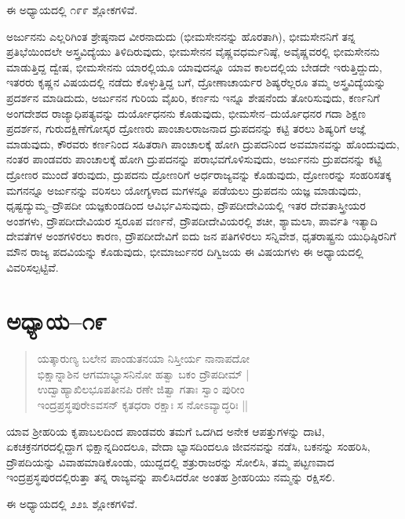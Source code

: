 ಈ ಅಧ್ಯಾಯದಲ್ಲಿ ೧೯೯ ಶ್ಲೋಕಗಳಿವೆ.

ಅರ್ಜುನನು ಎಲ್ಲರಿಗಿಂತ ಶ್ರೇಷ್ಠನಾದ ವೀರನಾದುದು (ಭೀಮಸೇನನನ್ನು ಹೊರತಾಗಿ), ಭೀಮಸೇನನಿಗೆ ತನ್ನ ಪ್ರತಿಭೆಯಿಂದಲೇ ಅಸ್ತ್ರವಿದ್ಯೆಯು ತಿಳಿದಿರುವುದು, ಭೀಮಸೇನನ ವೈಷ್ಣವಧರ್ಮನಿಷ್ಠೆ, ಅವೈಷ್ಣವರಲ್ಲಿ ಭೀಮಸೇನನು ಮಾಡುತ್ತಿದ್ದ ದ್ವೇಷ, ಭೀಮಸೇನನು ಯಾರಲ್ಲಿಯೂ ಯಾವುದನ್ನೂ ಯಾವ ಕಾಲದಲ್ಲಿಯ ಬೇಡದೇ ಇರುತ್ತಿದ್ದುದು, ಇತರರು ಕೃಷ್ಣನ ವಿಷಯದಲ್ಲಿ ನಡೆದು ಕೊಳ್ಳುತ್ತಿದ್ದ ಬಗೆ, ದ್ರೋಣಾಚಾರ್ಯರ ಶಿಷ್ಯರೆಲ್ಲರೂ ತಮ್ಮ ಅಸ್ತ್ರವಿದ್ಯೆಯನ್ನು ಪ್ರದರ್ಶನ ಮಾಡಿದುದು, ಅರ್ಜುನನ ಗುರಿಯ ವೈಖರಿ, ಕರ್ಣನು ಇನ್ನೂ ಶೇಷನೆಂದು ತೋರಿಸುವುದು, ಕರ್ಣನಿಗೆ ಅಂಗದೇಶದ ರಾಜ್ಯಾಧಿಪತ್ಯವನ್ನು ದುರ್ಯೋಧನನು ಕೊಡುವುದು, ಭೀಮಸೇನ–ದುರ್ಯೊಧನರ ಗದಾ ಶಿಕ್ಷಣ ಪ್ರದರ್ಶನ, ಗುರುದಕ್ಷಿಣೆಗೋಸ್ಕರ ದ್ರೋಣರು ಪಾಂಚಾಲರಾಜನಾದ ದ್ರುಪದನನ್ನು ಕಟ್ಟಿ ತರಲು ಶಿಷ್ಯರಿಗೆ ಆಜ್ಞೆ ಮಾಡುವುದು, ಕೌರವರು ಕರ್ಣನಿಂದ ಸಹಿತರಾಗಿ ಪಾಂಚಾಲಕ್ಕೆ ಹೋಗಿ ದ್ರುಪದನಿಂದ ಅವಮಾನವನ್ನು ಹೊಂದುವುದು, ನಂತರ ಪಾಂಡವರು ಪಾಂಚಾಲಕ್ಕೆ ಹೋಗಿ ದ್ರುಪದನನ್ನು ಪರಾಭವಗೊಳಿಸುವುದು, ಅರ್ಜುನನು ದ್ರುಪದನನ್ನು ಕಟ್ಟಿ ದ್ರೋಣರ ಮುಂದೆ ತರುವುದು, ದ್ರುಪದನು ದ್ರೋಣರಿಗೆ ಅರ್ಧರಾಜ್ಯವನ್ನು ಕೊಡುವುದು, ದ್ರೋಣರನ್ನು ಸಂಹರಿಸತಕ್ಕ ಮಗನನ್ನೂ ಅರ್ಜುನನ್ನು ವರಿಸಲು ಯೋಗ್ಯಳಾದ ಮಗಳನ್ನೂ ಪಡೆಯಲು ದ್ರುಪದನು ಯಜ್ಞ ಮಾಡುವುದು, ಧೃಷ್ಟದ್ಯುಮ್ಮ–ದ್ರೌಪದೀ ಯಜ್ಞಕುಂಡದಿಂದ ಆವಿರ್ಭವಿಸುವುದು, ದ್ರೌಪದೀದೇವಿಯಲ್ಲಿ ಇತರ ದೇವತಾಸ್ತ್ರೀಯರ ಅಂಶಗಳು, ದ್ರೌಪದೀದೇವಿಯರ ಸ್ವರೂಪ ವರ್ಣನೆ, ದ್ರೌಪದೀದೇವಿಯರಲ್ಲಿ ಶಚೀ, ಶ್ಯಾಮಲಾ, ಪಾರ್ವತಿ ಇತ್ಯಾದಿ ದೇವತೆಗಳ ಅಂಶಗಳಿರಲು ಕಾರಣ, ದ್ರೌಪದೀದೇವಿಗೆ ಐದು ಜನ ಪತಿಗಳಿರಲು ಸನ್ನಿವೇಶ, ಧೃತರಾಷ್ಟ್ರನು ಯುಧಿಷ್ಠಿರನಿಗೆ ಮೌನ ರಾಜ್ಯ ಪದವಿಯನ್ನು ಕೊಡುವುದು, ಭೀಮಾರ್ಜುನರ ದಿಗ್ವಿಜಯ ಈ ವಿಷಯಗಳು ಈ ಅಧ್ಯಾಯದಲ್ಲಿ ವಿವರಿಸಲ್ಪಟ್ಟಿವೆ.


\section{ಅಧ್ಯಾಯ–೧೯}

\begin{verse}
ಯತ್ಕಾರುಣ್ಯ ಬಲೇನ ಪಾಂಡುತನಯಾ ನಿಸ್ತೀರ್ಯ ನಾನಾಪದೋ\\ ಭಿಕ್ಷಾನ್ನಾಶಿನ ಆಗಮಾಭ್ಯಾಸನಿನೋ ಹತ್ವಾ ಬಕಂ ದ್ರೌಪದೀಮ್ |\\ ಉದ್ವಾಹ್ಯಾಖಿಲಭೂಪತೀನಪಿ ರಣೇ ಜಿತ್ವಾ ಗತಾಃ ಸ್ವಾಂ ಪುರೀಂ \\ ಇಂದ್ರಪ್ರಸ್ಥಪುರೇಽವಸನ್ ಕೃತಧರಾ ರಕ್ಷಾಃ ಸ ನೋಽವ್ಯಾದ್ಧರಿಃ ||
\end{verse}

ಯಾವ ಶ‍್ರೀಹರಿಯ ಕೃಪಾಬಲದಿಂದ ಪಾಂಡವರು ತಮಗೆ ಒದಗಿದ ಅನೇಕ ಆಪತ್ತುಗಳನ್ನು ದಾಟಿ, ಏಕಚಕ್ರನಗರದಲ್ಲಿದ್ದಾಗ ಭಿಕ್ಷಾನ್ನದಿಂದಲೂ, ವೇದಾ ಭ್ಯಾಸದಿಂದಲೂ ಜೀವನವನ್ನು ನಡೆಸಿ, ಬಕನನ್ನು ಸಂಹರಿಸಿ, ದ್ರೌಪದಿಯನ್ನು ವಿವಾಹಮಾಡಿಕೊಂಡು, ಯುದ್ದದಲ್ಲಿ ಶತ್ರುರಾಜರನ್ನು ಸೋಲಿಸಿ, ತಮ್ಮ ಪಟ್ಟಣವಾದ ಇಂದ್ರಪ್ರಸ್ಥಪುರದಲ್ಲಿರುತ್ತಾ ತನ್ನ ರಾಜ್ಯವನ್ನು ಪಾಲಿಸಿದರೋ ಅಂತಹ ಶ‍್ರೀಹರಿಯು ನಮ್ಮನ್ನು ರಕ್ಷಿಸಲಿ.

ಈ ಅಧ್ಯಾಯದಲ್ಲಿ ೨೨೩ ಶ್ಲೋಕಗಳಿವೆ.

